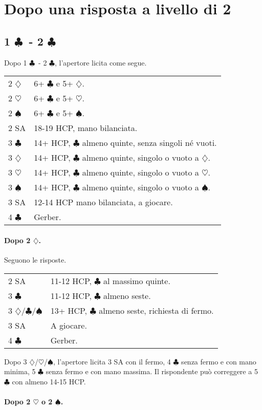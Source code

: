 \documentclass[a4paper,10pt]{article}
\renewcommand{\c}{$\clubsuit$\xspace}
\renewcommand{\d}{$\diamondsuit$\xspace}
\newcommand{\h}{$\heartsuit$\xspace}
\newcommand{\s}{$\spadesuit$\xspace}
\newcommand{\sa}{SA\xspace}
\newcommand{\smallspace}{\vskip0.3cm}
\newenvironment{twocol}
  {\smallspace\noindent\begin{tabular}{l p{0.78\textwidth}}}
  {\end{tabular}\smallspace}
\begin{document}
\section{Dopo una risposta a livello di 2}

\subsection{1 \c\ - 2 \c}

Dopo 1 \c\ - 2 \c, l'apertore licita come segue.

\begin{twocol}
	2 \d & 6+ \c e 5+ \d. \\
	2 \h & 6+ \c e 5+ \h. \\
	2 \s & 6+ \c e 5+ \s. \\
	2 SA & 18-19 HCP, mano bilanciata. \\
	3 \c & 14+ HCP, \c almeno quinte, senza singoli né vuoti. \\
	3 \d & 14+ HCP, \c almeno quinte, singolo o vuoto a \d.\\
	3 \h & 14+ HCP, \c almeno quinte, singolo o vuoto a \h.\\
	3 \s & 14+ HCP, \c almeno quinte, singolo o vuoto a \s.\\
	3 \sa & 12-14 HCP mano bilanciata, a giocare.\\
	4 \c & Gerber.
\end{twocol}

\paragraph{Dopo 2 \d.}

Seguono le risposte.

\begin{twocol}
	2 \sa & 11-12 HCP, \c al massimo quinte. \\
	3 \c & 11-12 HCP, \c almeno seste. \\
	3 \d/\c/\s & 13+ HCP, \c almeno seste, richiesta di fermo. \\
	3 \sa & A giocare. \\
	4 \c & Gerber.
\end{twocol}

Dopo 3 \d/\h/\s, l'apertore licita 3 \sa con il fermo, 4 \c senza fermo e con mano minima, 5 \c senza fermo e con mano massima. Il rispondente può correggere a 5 \c con almeno 14-15 HCP.

\paragraph{Dopo 2 \h o 2 \s.}
\end{document}
